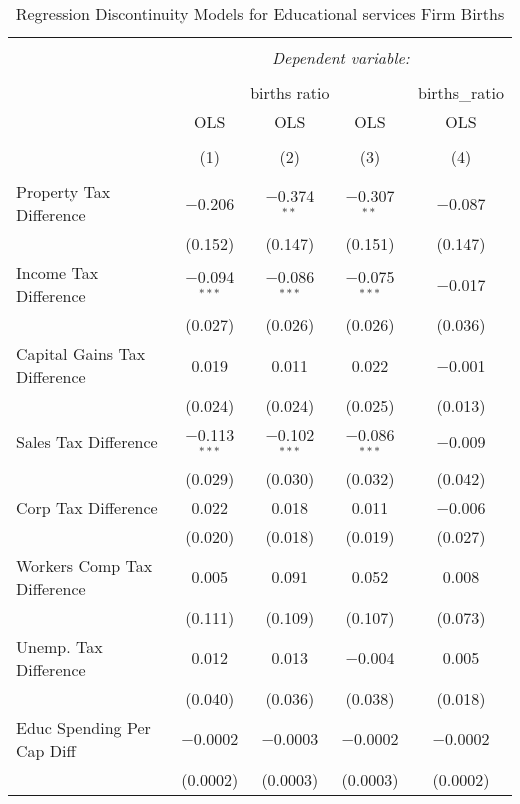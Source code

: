 
\begin{table}[!htbp] \centering 
  \caption{Regression Discontinuity Models for  Educational services Firm Births} 
  \label{61rd} 
\begin{tabular}{@{\extracolsep{5pt}}lcccc} 
\\[-1.8ex]\hline 
\hline \\[-1.8ex] 
 & \multicolumn{4}{c}{\textit{Dependent variable:}} \\ 
\cline{2-5} 
\\[-1.8ex] & \multicolumn{3}{c}{births ratio} & births\_ratio \\ 
 & OLS & OLS & OLS & OLS \\ 
\\[-1.8ex] & (1) & (2) & (3) & (4)\\ 
\hline \\[-1.8ex] 
 Property Tax Difference & $-$0.206 & $-$0.374$^{**}$ & $-$0.307$^{**}$ & $-$0.087 \\ 
  & (0.152) & (0.147) & (0.151) & (0.147) \\ 
  Income Tax Difference & $-$0.094$^{***}$ & $-$0.086$^{***}$ & $-$0.075$^{***}$ & $-$0.017 \\ 
  & (0.027) & (0.026) & (0.026) & (0.036) \\ 
  Capital Gains Tax Difference & 0.019 & 0.011 & 0.022 & $-$0.001 \\ 
  & (0.024) & (0.024) & (0.025) & (0.013) \\ 
  Sales Tax Difference & $-$0.113$^{***}$ & $-$0.102$^{***}$ & $-$0.086$^{***}$ & $-$0.009 \\ 
  & (0.029) & (0.030) & (0.032) & (0.042) \\ 
  Corp Tax Difference & 0.022 & 0.018 & 0.011 & $-$0.006 \\ 
  & (0.020) & (0.018) & (0.019) & (0.027) \\ 
  Workers Comp Tax Difference & 0.005 & 0.091 & 0.052 & 0.008 \\ 
  & (0.111) & (0.109) & (0.107) & (0.073) \\ 
  Unemp. Tax Difference & 0.012 & 0.013 & $-$0.004 & 0.005 \\ 
  & (0.040) & (0.036) & (0.038) & (0.018) \\ 
  Educ Spending Per Cap Diff & $-$0.0002 & $-$0.0003 & $-$0.0002 & $-$0.0002 \\ 
  & (0.0002) & (0.0003) & (0.0003) & (0.0002) \\ 

\end{tabular}
\end{table}
